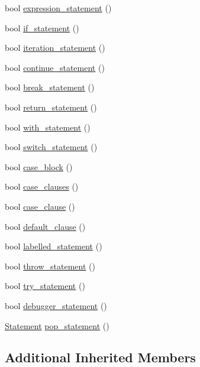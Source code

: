 \begin{DoxyCompactItemize}
bool \hyperlink{class_statement_parser_ac46b790b4cdf354e5dbc529726ba41a0}{expression\+\_\+statement} ()
\item 
bool \hyperlink{class_statement_parser_a1cc1b35c9bd2981e64427959bb00547c}{if\+\_\+statement} ()
\item 
bool \hyperlink{class_statement_parser_a7d9e01f8dcaa8f9dd80c38447dc2b062}{iteration\+\_\+statement} ()
\item 
bool \hyperlink{class_statement_parser_af2abe2eedf21dd40d9e13f40541fda53}{continue\+\_\+statement} ()
\item 
bool \hyperlink{class_statement_parser_ae665f84bdb0e6b68659ddd5d4d7517de}{break\+\_\+statement} ()
\item 
bool \hyperlink{class_statement_parser_a9a387ad83f2e0ad8e7e5f43292f8ef13}{return\+\_\+statement} ()
\item 
bool \hyperlink{class_statement_parser_aeff39f49a917ae145c007a7864997938}{with\+\_\+statement} ()
\item 
bool \hyperlink{class_statement_parser_a70a1e436ab6ca9201c4da4daf7ae6427}{switch\+\_\+statement} ()
\item 
bool \hyperlink{class_statement_parser_ac6ced197cf2d03f605b60eabffac69e7}{case\+\_\+block} ()
\item 
bool \hyperlink{class_statement_parser_a9e881c4f9e19cc92c8867758726ddc0a}{case\+\_\+clauses} ()
\item 
bool \hyperlink{class_statement_parser_a83788efe31a52f4ec8069507bf651554}{case\+\_\+clause} ()
\item 
bool \hyperlink{class_statement_parser_a0b452f8881497dfca5e013841b6b2bf0}{default\+\_\+clause} ()
\item 
bool \hyperlink{class_statement_parser_ad4df784550332b81962ca007c289b697}{labelled\+\_\+statement} ()
\item 
bool \hyperlink{class_statement_parser_aeabdf795b281d50cb95d25815e4e82ff}{throw\+\_\+statement} ()
\item 
bool \hyperlink{class_statement_parser_ab65afb31b978dd218b5e19dfd6231fc0}{try\+\_\+statement} ()
\item 
bool \hyperlink{class_statement_parser_aaed5a1e3f4ea50fe9bc20f81f4e830d0}{debugger\+\_\+statement} ()
\item 
\hyperlink{ast_8h_a8b6ddf3732a0acd77e6b2509fb21a5fd}{Statement} \hyperlink{class_statement_parser_a39fbe3737dc36b78e5c6505da800b531}{pop\+\_\+statement} ()
\end{DoxyCompactItemize}
\subsection*{Additional Inherited Members}


